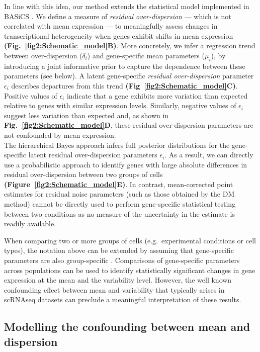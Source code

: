 In line with this idea, our method extends the statistical model implemented in BASiCS \citep{Vallejos2015BASiCS, Vallejos2016}. We define a measure of \textit{residual over-dispersion} --- which is not correlated with mean expression --- to meaningfully assess changes in transcriptional heterogeneity when genes exhibit shifts in mean expression \textbf{(Fig.~\ref{fig2:Schematic_model}B)}. More concretely, we infer a regression trend between over-dispersion ($\delta_i$) and gene-specific mean parameters ($\mu_i$), by introducing a joint informative prior to capture the dependence between these parameters (see below). A latent gene-specific {\it residual over-dispersion} parameter $\epsilon_i$ describes departures from this trend \textbf{(Fig~\ref{fig2:Schematic_model}C)}. Positive values of $\epsilon_i$ indicate that a gene exhibits more variation than expected relative to genes with similar expression levels. Similarly, negative values of $\epsilon_i$ suggest less variation than expected and, as shown in \textbf{Fig.~\ref{fig2:Schematic_model}D}, these residual over-dispersion parameters are not confounded by mean expression. \\

The hierarchical Bayes approach infers full posterior distributions for the gene-specific latent residual over-dispersion parameters $\epsilon_i$. As a result, we can directly use a probabilistic approach to identify genes with large absolute differences in residual over-dispersion between two groups of cells \textbf{(Figure~\ref{fig2:Schematic_model}E)}. In contrast, mean-corrected point estimates for residual noise parameters (such as those obtained by the DM method) cannot be directly used to perform gene-specific statistical testing between two conditions as no measure of the uncertainty in the estimate is readily available.

When comparing two or more groups of cells (e.g.~experimental conditions or cell types), the notation above can be extended by assuming that gene-specific parameters are also group-specific \citep[as in][]{Vallejos2016}. Comparisons of gene-specific parameters across populations can be used to identify statistically significant changes in gene expression at the mean and the variability level. However, the well known confounding effect between mean and variability that typically arises in scRNAseq datasets \citep{Brennecke2013} can preclude a meaningful interpretation of these results.  

\subsection{Modelling the confounding between mean and dispersion} \label{sec2:extended_BASiCS}

